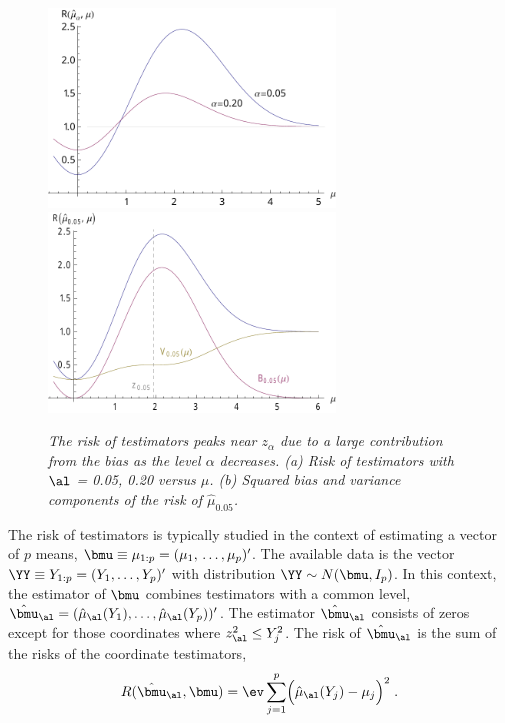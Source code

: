 \documentclass[12pt]{article}
\begin{document}
 \begin{figure}
 \caption{ \label{fig:risk} \sl The risk of testimators peaks near $z_\alpha$ due to a large contribution from the bias as the level $\alpha$ decreases. (a) Risk of testimators with
 $\al$ = 0.05, 0.20 versus $\mu$. (b) Squared bias and variance components of the
 risk of $\hat\mu_{0.05}$. } 
 \vspace{0.1in}
\centerline{
 \includegraphics[width=3.0in]{figures/risk_a}
 \includegraphics[width=3.0in]{figures/risk_b} }
 \vspace{0.2in}
 \end{figure}
 

 The risk of testimators is typically studied in the context of
 estimating a vector of $p$ means, $\bmu \equiv \mu_{1:p} =
 (\mu_1, \,\ldots, \mu_p)'$.  The available data is the vector $\YY \equiv Y_{1:p} =
 (Y_1, \ldots, Y_p)'$ with distribution $\YY \sim N(\bmu,I_p)$.  In this context, the estimator
 of $\bmu$ combines testimators with a common level, $\hat{\bmu}_\al =
 (\hat\mu_\al(Y_1), \ldots, \hat\mu_\al(Y_p))'$.  The estimator $\hat{\bmu}_\al$
 consists of zeros except for those coordinates where $z_\al^2 \le Y_j^2$.  The
 risk of $\hat{\bmu}_\al$ is the sum of the risks of the coordinate testimators,
 \begin{equation}
    R(\hat{\bmu}_\al, \bmu) 
      = \ev \sum_{j=1}^p \Bigl( \hat{\mu}_{\al}(Y_j) - \mu_j \Bigr)^2 \;.
 \label{eq:risk}
 \end{equation}
\end{document}
